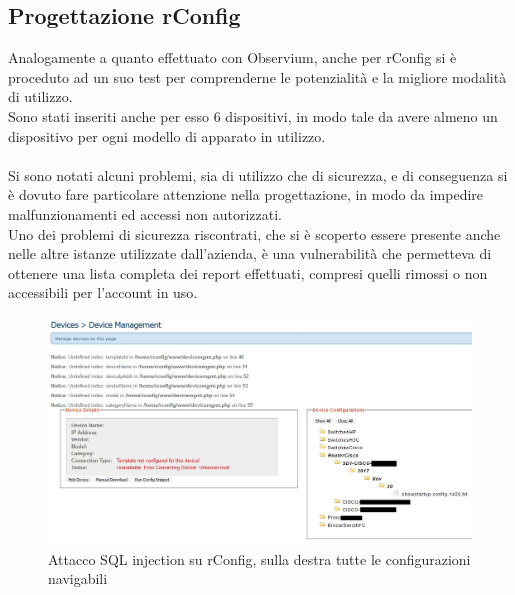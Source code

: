 \documentclass[Realizzazione.tex]{subfiles}
\begin{document}
\subsection{Progettazione rConfig}
Analogamente a quanto effettuato con Observium, anche per rConfig si è proceduto ad un suo test per comprenderne le potenzialità e la migliore modalità di utilizzo. \\
Sono stati inseriti anche per esso 6 dispositivi, in modo tale da avere almeno un dispositivo per ogni modello di apparato in utilizzo. \\\\
Si sono notati alcuni problemi, sia di utilizzo che di sicurezza, e di conseguenza si è dovuto fare particolare attenzione nella progettazione, in modo da impedire malfunzionamenti ed accessi non autorizzati. \\
Uno dei problemi di sicurezza riscontrati, che si è scoperto essere presente anche nelle altre istanze utilizzate dall'azienda, è una vulnerabilità  che permetteva di ottenere una lista completa dei report effettuati, compresi quelli rimossi o non accessibili per l'account in uso. \\
\begin{figure}[H]
	\centering
	\includegraphics[width=1\linewidth]{"images/rConfig_SQLi"}
	\caption{Attacco SQL injection su rConfig, sulla destra tutte le configurazioni navigabili}
	\label{fig:Attacco SQL injection su rConfig, sulla destra tutte le configurazioni navigabili}
\end{figure}
\end{document}
